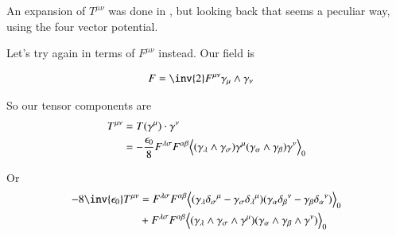 \documentclass{article}
\begin{document}
An expansion of $T^{\mu\nu}$ was done in \cite{PJemstresstensor}, but looking
back that seems a peculiar way, using the four vector potential.

Let's try again in terms of $F^{\mu\nu}$ instead.  Our field is

\begin{align}
F 
&= \inv{2} F^{\mu\nu} \gamma_{\mu} \wedge \gamma_\nu 
\end{align}

So our tensor components are
\begin{align*}
T^{\mu\nu}
&= T(\gamma^\mu) \cdot \gamma^\nu \\
&= -\frac{\epsilon_0}{8} F^{\lambda\sigma} F^{\alpha\beta} 
{\left\langle{{ (\gamma_\lambda \wedge \gamma_\sigma) \gamma^\mu (\gamma_\alpha \wedge \gamma_\beta) \gamma^\nu }}\right\rangle}_{0} \\
\end{align*}

Or
\begin{align*}
-8{\inv{\epsilon_0}} T^{\mu\nu}
&= 
F^{\lambda\sigma} F^{\alpha\beta} 
\gpgradezero{ 
(\gamma_\lambda {\delta_\sigma}^\mu 
-\gamma_\sigma {\delta_\lambda}^\mu)
(\gamma_\alpha {\delta_\beta}^\nu 
-\gamma_\beta {\delta_\alpha}^\nu)
} \\
&+
F^{\lambda\sigma} F^{\alpha\beta} 
\gpgradezero{ (\gamma_\lambda \wedge \gamma_\sigma \wedge \gamma^\mu) (\gamma_\alpha \wedge \gamma_\beta \wedge \gamma^\nu) } \\
\end{align*}
\end{document}
